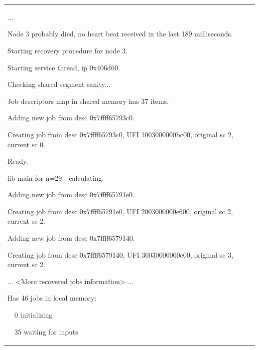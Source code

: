\documentclass[a4paper]{article}
\begin{document}
\begin{flushleft}
\tablehead{}
\begin{supertabular}{|m{6.4018598in}|}
\hline
{\ttfamily ...}

{\ttfamily [Watchdog] Node 3 probably died, no
heart beat received in the last 189 milliseconds.}

{\ttfamily [Manager 1] Starting recovery
procedure for node 3.}

{\ttfamily [Manager 1] Starting service thread,
ip 0x406d60.}

{ Checking
shared segment sanity...}

{ Job
descriptors map in shared memory has 37 items.}

{ Adding new
job from desc 0x7ffff65793c0.}

{\ttfamily [Job 1003000000bc00] Creating job
from desc 0x7ffff65793c0, UFI 1003000000bc00, original sc 2, current sc
0.}

{\ttfamily [Job 1003000000bc00] Ready.}

{ fib main for n=29 - calculating.}

{ Adding new
job from desc 0x7ffff65791e0.}

{\ttfamily [Job 2003000000e600] Creating job
from desc 0x7ffff65791e0, UFI 2003000000e600, original sc 2, current sc
2.}

{ Adding new
job from desc 0x7ffff6579140.}

{\ttfamily [Job 30030000000c00] Creating job
from desc 0x7ffff6579140, UFI 30030000000c00, original sc 3, current sc
2.}

{\ttfamily ... {\textless}More recovered jobs
information{\textgreater} ...}

{ Has 46
jobs in local memory:}

{\ttfamily \ \ 0 initializing}

{\ttfamily \ \ 35 waiting for inputs}


\end{supertabular}
\end{flushleft}
\end{document}

